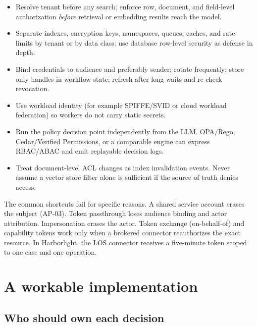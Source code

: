 \begin{itemize}

\item Resolve tenant before any search; enforce row, document, and field-level authorization \emph{before} retrieval or embedding results reach the model.

\item Separate indexes, encryption keys, namespaces, queues, caches, and rate limits by tenant or by data class; use database row-level security as defense in depth.

\item Bind credentials to audience and preferably sender; rotate frequently; store only handles in workflow state; refresh after long waits and re-check revocation.

\item Use workload identity (for example SPIFFE/SVID or cloud workload federation) so workers do not carry static secrets.

\item Run the policy decision point independently from the LLM. OPA/Rego, Cedar/Verified Permissions, or a comparable engine can express RBAC/ABAC and emit replayable decision logs.

\item Treat document-level ACL changes as index invalidation events. Never assume a vector store filter alone is sufficient if the source of truth denies access.

\end{itemize}

The common shortcuts fail for specific reasons. A shared service account erases the subject (AP-03). Token passthrough loses audience binding and actor attribution. Impersonation erases the actor. Token exchange (on-behalf-of) and capability tokens work only when a brokered connector reauthorizes the exact resource. In Harborlight, the LOS connector receives a five-minute token scoped to one case and one operation.\par

\section{A workable implementation}

\subsection{Who should own each decision}

